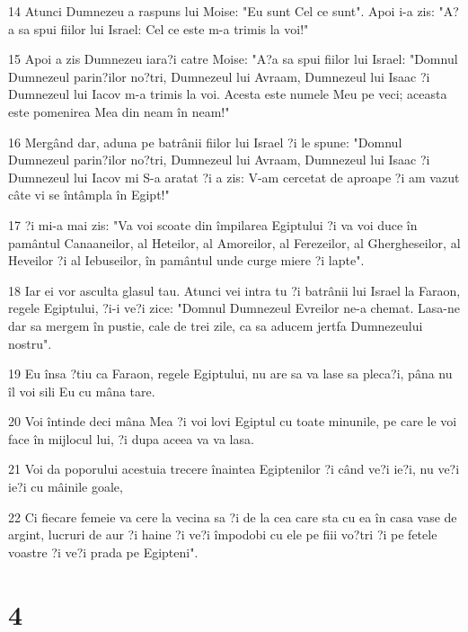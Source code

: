 \par 14 Atunci Dumnezeu a raspuns lui Moise: "Eu sunt Cel ce sunt". Apoi i-a zis: "A?a sa spui fiilor lui Israel: Cel ce este m-a trimis la voi!"
\par 15 Apoi a zis Dumnezeu iara?i catre Moise: "A?a sa spui fiilor lui Israel: "Domnul Dumnezeul parin?ilor no?tri, Dumnezeul lui Avraam, Dumnezeul lui Isaac ?i Dumnezeul lui Iacov m-a trimis la voi. Acesta este numele Meu pe veci; aceasta este pomenirea Mea din neam în neam!"
\par 16 Mergând dar, aduna pe batrânii fiilor lui Israel ?i le spune: "Domnul Dumnezeul parin?ilor no?tri, Dumnezeul lui Avraam, Dumnezeul lui Isaac ?i Dumnezeul lui Iacov mi S-a aratat ?i a zis: V-am cercetat de aproape ?i am vazut câte vi se întâmpla în Egipt!"
\par 17 ?i mi-a mai zis: "Va voi scoate din împilarea Egiptului ?i va voi duce în pamântul Canaaneilor, al Heteilor, al Amoreilor, al Ferezeilor, al Ghergheseilor, al Heveilor ?i al Iebuseilor, în pamântul unde curge miere ?i lapte".
\par 18 Iar ei vor asculta glasul tau. Atunci vei intra tu ?i batrânii lui Israel la Faraon, regele Egiptului, ?i-i ve?i zice: "Domnul Dumnezeul Evreilor ne-a chemat. Lasa-ne dar sa mergem în pustie, cale de trei zile, ca sa aducem jertfa Dumnezeului nostru".
\par 19 Eu însa ?tiu ca Faraon, regele Egiptului, nu are sa va lase sa pleca?i, pâna nu îl voi sili Eu cu mâna tare.
\par 20 Voi întinde deci mâna Mea ?i voi lovi Egiptul cu toate minunile, pe care le voi face în mijlocul lui, ?i dupa aceea va va lasa.
\par 21 Voi da poporului acestuia trecere înaintea Egiptenilor ?i când ve?i ie?i, nu ve?i ie?i cu mâinile goale,
\par 22 Ci fiecare femeie va cere la vecina sa ?i de la cea care sta cu ea în casa vase de argint, lucruri de aur ?i haine ?i ve?i împodobi cu ele pe fiii vo?tri ?i pe fetele voastre ?i ve?i prada pe Egipteni".

\chapter{4}

